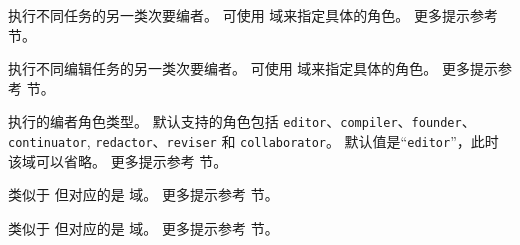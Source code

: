 \begin{fieldlist}

执行不同任务的另一类次要编者。
可使用  域来指定具体的角色。
更多提示参考  节。




执行不同编辑任务的另一类次要编者。
可使用  域来指定具体的角色。
更多提示参考  节。




 执行的编者角色类型。
默认支持的角色包括 \texttt{editor}、\texttt{compiler}、\texttt{founder}、\texttt{continuator}, \texttt{redactor}、\texttt{reviser} 和 \texttt{collaborator}。
默认值是“\texttt{editor}”，此时该域可以省略。
更多提示参考  节。




类似于  但对应的是  域。
更多提示参考  节。




类似于  但对应的是  域。
更多提示参考  节。




\end{fieldlist}
